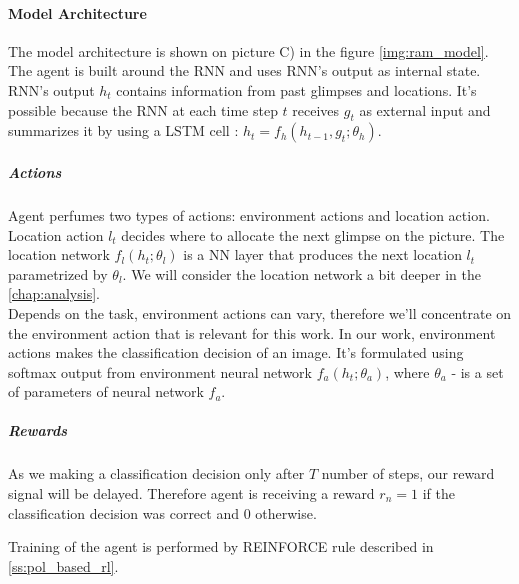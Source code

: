 \paragraph{Model Architecture} The model architecture is shown
on picture C) in the figure \ref{img:ram_model}. The agent is built around
the RNN and uses RNN's output as internal state. RNN's output $h_t$ contains
information from past glimpses and locations. It's possible
because the RNN at each time step $t$ receives $g_t$ as external input and
summarizes it by using a LSTM cell : $h_t = f_h(h_{t-1}, g_t; \theta_h)$.

\subparagraph{Actions} Agent perfumes two types of actions: environment actions
and location action. Location action $l_t$ decides where to allocate the next glimpse
on the picture. The location network $f_l(h_t; \theta_l)$ is a NN layer
that produces the next location $l_t$ parametrized by $\theta_l$. We will consider the
location network a bit deeper in the \autoref{chap:analysis}. \\
Depends on the task, environment actions can vary, therefore
we'll concentrate on the environment action that is relevant for this work.
In our work, environment actions makes the classification decision of an image.
It's formulated using softmax output from environment neural network
 $f_a(h_t; \theta_a)$, where $\theta_a$ - is a set of parameters of neural network $f_a$.

\subparagraph{Rewards} As we making a classification decision only after $T$
number of steps, our reward signal will be delayed. Therefore agent is receiving
a reward $r_n = 1$ if the classification decision was correct and $0$ otherwise.


Training of the agent is performed by REINFORCE rule described in \autoref{ss:pol_based_rl}.










